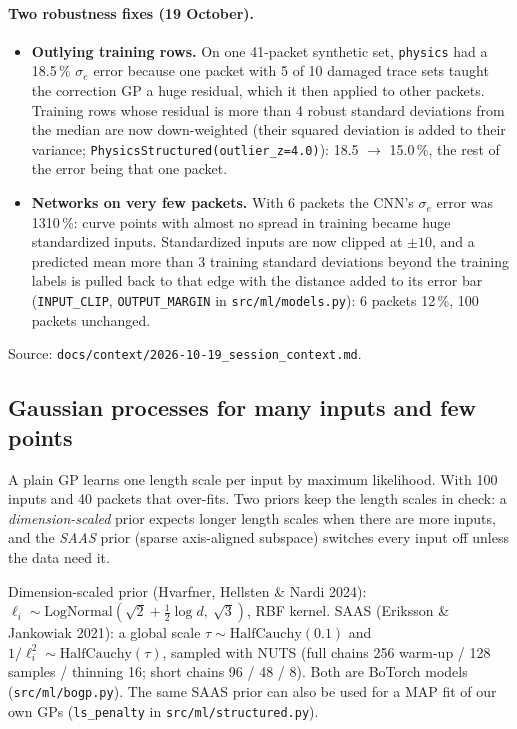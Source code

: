 \documentclass[10pt]{article}
\newcommand{\code}[1]{\texttt{#1}}
\begin{document}
\paragraph{Two robustness fixes (19 October).}
\begin{itemize}
\item \textbf{Outlying training rows.} On one 41-packet synthetic set, \code{physics} had a 18.5\,\% $\sigma_e$ error because one packet with
  5 of 10 damaged trace sets taught the correction GP a huge residual, which it then applied to other packets. Training rows whose
  residual is more than 4 robust standard deviations from the median are now down-weighted (their squared deviation is added to their
  variance; \code{PhysicsStructured(outlier\_z=4.0)}): 18.5 $\to$ 15.0\,\%, the rest of the error being that one packet.
\item \textbf{Networks on very few packets.} With 6 packets the CNN's $\sigma_e$ error was 1310\,\%: curve points with almost no spread in
  training became huge standardized inputs. Standardized inputs are now clipped at $\pm10$, and a predicted mean more than 3 training
  standard deviations beyond the training labels is pulled back to that edge with the distance added to its error bar
  (\code{INPUT\_CLIP}, \code{OUTPUT\_MARGIN} in \code{src/ml/models.py}): 6 packets 12\,\%, 100 packets unchanged.
\end{itemize}
Source: \code{docs/context/2026-10-19\_session\_context.md}.

\subsection{Gaussian processes for many inputs and few points}
\label{sec:lvl1saas}

\begin{basic}
A plain GP learns one length scale per input by maximum likelihood. With 100 inputs and 40 packets that over-fits. Two priors keep the
length scales in check: a \emph{dimension-scaled} prior expects longer length scales when there are more inputs, and the \emph{SAAS}
prior (sparse axis-aligned subspace) switches every input off unless the data need it.
\end{basic}
\begin{advanced}
Dimension-scaled prior (Hvarfner, Hellsten \& Nardi 2024): $\ell_i \sim \mathrm{LogNormal}(\sqrt2 + \tfrac12\log d,\ \sqrt3)$, RBF kernel.
SAAS (Eriksson \& Jankowiak 2021): a global scale $\tau \sim \mathrm{HalfCauchy}(0.1)$ and $1/\ell_i^2 \sim \mathrm{HalfCauchy}(\tau)$,
sampled with NUTS (full chains 256 warm-up / 128 samples / thinning 16; short chains 96 / 48 / 8). Both are BoTorch models
(\code{src/ml/bogp.py}). The same SAAS prior can also be used for a MAP fit of our own GPs (\code{ls\_penalty} in
\code{src/ml/structured.py}).
\end{advanced}
\end{document}
